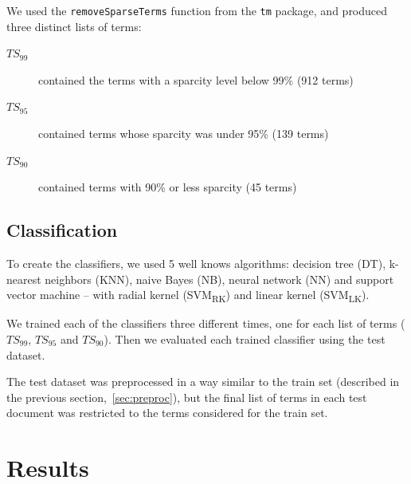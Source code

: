 \documentclass[conference]{IEEEtran}
\begin{document}
We used the \texttt{removeSparseTerms} function from the \texttt{tm}
package, and produced three distinct lists of terms:
\begin{description}
    \item[$TS_{99}$] contained the terms with a sparcity level below 99\% (912 terms)
    \item[$TS_{95}$] contained terms whose sparcity was under 95\% (139 terms)
    \item[$TS_{90}$] contained terms with 90\% or less sparcity (45 terms)
\end{description}

\subsection{Classification}

To create the classifiers, we used 5 well knows algorithms: decision
tree (DT), k-nearest neighbors (KNN), naive Bayes (NB), neural network
(NN) and support vector
machine -- with radial kernel (SVM\textsubscript{RK}) and linear
kernel (SVM\textsubscript{LK}).

We trained each of the classifiers three different times, one for each
list of terms ($TS_{99}$, $TS_{95}$ and $TS_{90}$). Then we evaluated
each trained classifier using the test dataset.

The test dataset was preprocessed in a way similar to the train set
(described in the previous section,~\ref{sec:preproc}),
but the final list of terms in each test document was restricted to the
terms considered for the train set.

\section{Results}
\end{document}
